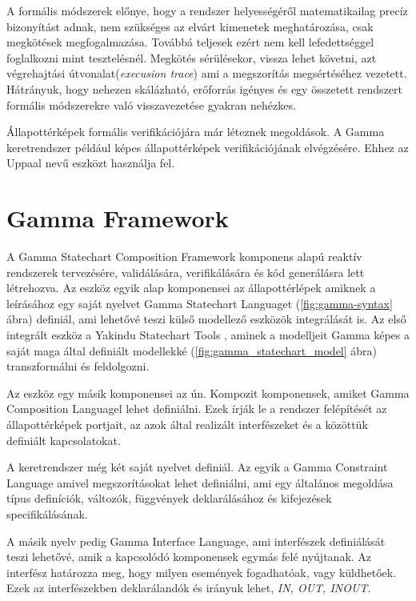 A formális módszerek előnye, hogy a rendszer helyességéről matematikailag precíz bizonyítást adnak, nem szükséges az elvárt kimenetek meghatározása, csak megkötések megfogalmazása. Továbbá teljesek ezért nem kell lefedettséggel foglalkozni mint tesztelésnél. Megkötés sérülésekor, vissza lehet követni, azt végrehajtási útvonalat(\emph{execusion trace}) ami a megszorítás megsértéséhez vezetett. Hátrányuk, hogy nehezen skálázható, erőforrás igényes és egy összetett rendszert formális módszerekre való visszavezetése gyakran nehézkes.

Állapottérképek formális verifikációjára már léteznek megoldások. A Gamma keretrendszer például képes állapottérképek verifikációjának elvégzésére. Ehhez az Uppaal \cite{bengtsson1995uppaal, bengtsson1998new} nevű eszközt használja fel.

\section{Gamma Framework}

A Gamma Statechart Composition Framework\cite{gammaf} komponens alapú reaktív rendszerek tervezésére, validálására, verifikálására és kód generálásra lett létrehozva. Az eszköz egyik alap komponensei az állapottérlépek amiknek a leírásához egy saját nyelvet Gamma Statechart Languaget (\ref{fig:gamma-syntax} ábra) definiál, ami lehetővé teszi külső modellező eszközök integrálását is. Az első integrált eszköz a Yakindu Statechart Tools \cite{toolsyakindu}, aminek a modelljeit Gamma képes a saját maga által definiált modellekké (\ref{fig:gamma_statechart_model} ábra) transzformálni és feldolgozni.

Az eszköz egy másik komponensei az ún. Kompozit komponensek, amiket Gamma Composition Languagel lehet definiálni. Ezek írják le a rendszer felépítését az állapottérképek portjait, az azok által realizált interfészeket és a közöttük definiált kapcsolatokat.

A keretrendszer még két saját nyelvet definiál. Az egyik a Gamma Constraint Language amivel megszorításokat lehet definiálni, ami egy általános megoldása típus definíciók, változók, függvények deklarálásához és kifejezések specifikálásának.

A másik nyelv pedig Gamma Interface Language, ami interfészek definiálását teszi lehetővé, amik a kapcsolódó komponensek egymás felé nyújtanak. Az interfész határozza meg, hogy milyen események fogadhatóak, vagy küldhetőek. Ezek az interfészekben deklarálandók és irányuk lehet, \emph{IN, OUT, INOUT}.

